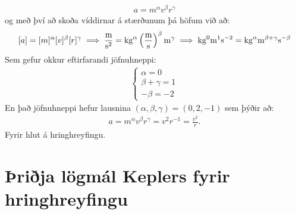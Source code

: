 \begin{align*}
    a = m^{\alpha}v^\beta r^\gamma
\end{align*}
og með því að skoða víddirnar á stærðunum þá höfum við að:
\begin{align*}
    \left[ a \right] = [m]^{\alpha}[v]^\beta [r]^\gamma \implies \si[per-mode=fraction]{\frac{m}{s^2}} = \si{kg}^\alpha \left(\si{\frac{m}{s}}\right)^\beta \si{m}^\gamma \implies \si{kg}^{0}\si{m}^1 \si{s}^{-2} = \si{kg}^\alpha \si{m}^{\beta + \gamma} \si{s}^{-\beta}
\end{align*}
Sem gefur okkur eftirfarandi jöfnuhneppi:
\begin{align*}
    \begin{cases}
    \alpha = 0 \\
    \beta + \gamma = 1 \\
    -\beta = -2
    \end{cases}
\end{align*}
En það jöfnuhneppi hefur lausnina $(\alpha, \beta, \gamma) = (0,2,-1)$ sem þýðir að:
\begin{align*}
    a = m^{\alpha}v^\beta r^\gamma = v^2r^{-1} = \frac{v^2}{r}.
\end{align*}
Fyrir hlut á hringhreyfingu.



\section{Þriðja lögmál Keplers fyrir hringhreyfingu}

